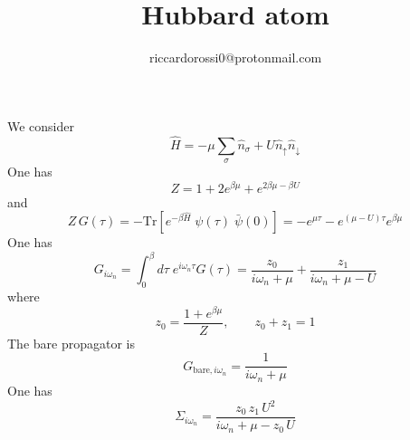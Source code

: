 \documentclass{article}
\title{Hubbard atom}
\author{riccardorossi0@protonmail.com}
\begin{document}
\maketitle
We consider
$$
\hat{H}=-\mu\sum_{\sigma}\hat{n}_\sigma + U\hat{n}_\uparrow \hat{n}_\downarrow
$$
One has
$$
Z = 1+2e^{\beta\mu}+e^{2\beta\mu-\beta U}
$$
and
$$
Z\,G(\tau) = -\text{Tr}\left[e^{-\beta \hat{H}}\;\psi(\tau)\;\bar{\psi}(0)\right]= -e^{\mu\tau}-e^{(\mu-U)\tau}e^{\beta\mu}
$$
One has
$$
G_{i\omega_n}=\int_0^\beta d\tau\;e^{i\omega_n\tau}G(\tau)=\frac{z_0}{i\omega_n+\mu}+\frac{z_1}{i\omega_n+\mu-U}
$$
where
$$
z_0 = \frac{1+e^{\beta\mu}}{Z}, \qquad z_0+z_1 = 1
$$
The bare propagator is
$$
G_{\text{bare},i\omega_n}=\frac{1}{i\omega_n+\mu}
$$
One has
$$
\Sigma_{i\omega_n}=\frac{z_0\,z_1\,U^2}{i\omega_n+\mu-z_0\,U}
$$
\end{document}
